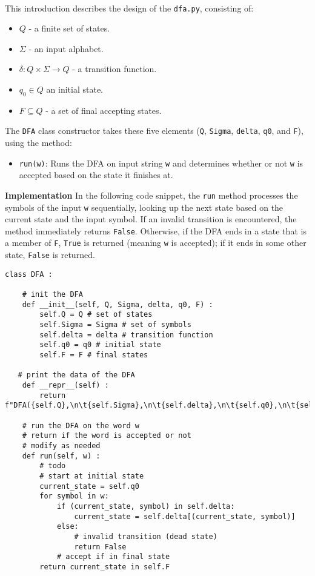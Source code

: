 \documentclass{article}
\theoremstyle{theorem}
\theoremstyle{definition}
\theoremstyle{remark}
\begin{document}
\textbf{}\\
This introduction describes the design of the \texttt{dfa.py},  consisting of:
\begin{itemize}
  \item$Q$ - a finite set of states.
  \item$\Sigma$ - an input alphabet.
  \item$\delta : Q \times \Sigma \to Q$ - a transition function.
  \item$q_0 \in Q$ an initial state.
  \item$F \subseteq Q$ - a set of final accepting states.
\end{itemize}

The \texttt{DFA} class constructor takes these five elements (\texttt{Q}, \texttt{Sigma}, \texttt{delta}, \texttt{q0}, and \texttt{F}), using the method:
\begin{itemize}
  \item \texttt{run(w)}: Runs the DFA on input string \texttt{w} and determines whether or not \texttt{w} is accepted based on the state it finishes at.
\end{itemize}

\textbf{Implementation}
In the following code snippet, the \texttt{run} method processes the symbols of the input \texttt{w} sequentially, looking up the next state based on the current state and the input symbol. If an invalid transition is encountered, the method immediately returns \texttt{False}. Otherwise, if the DFA ends in a state that is a member of \texttt{F}, \texttt{True} is returned (meaning \texttt{w} is accepted); if it ends in some other state, \texttt{False} is returned.

\begin{lstlisting}
class DFA :

    # init the DFA
    def __init__(self, Q, Sigma, delta, q0, F) : 
        self.Q = Q # set of states
        self.Sigma = Sigma # set of symbols
        self.delta = delta # transition function
        self.q0 = q0 # initial state
        self.F = F # final states
   
   # print the data of the DFA
    def __repr__(self) :
        return f"DFA({self.Q},\n\t{self.Sigma},\n\t{self.delta},\n\t{self.q0},\n\t{self.F})"

    # run the DFA on the word w
    # return if the word is accepted or not
    # modify as needed
    def run(self, w) :
        # todo
        # start at initial state
        current_state = self.q0
        for symbol in w:
            if (current_state, symbol) in self.delta:
                current_state = self.delta[(current_state, symbol)]
            else:
                # invalid transition (dead state)
                return False
            # accept if in final state
        return current_state in self.F 

\end{lstlisting}
\end{document}

